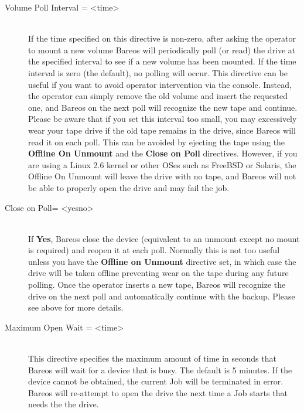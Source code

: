 \begin{description}
\item [Volume Poll Interval = {\textless}time{\textgreater}] \hfill \\
If the time  specified on this directive is non-zero, after  asking the
operator to mount a new volume Bareos will  periodically poll (or read) the
drive at the specified  interval to see if a new volume has been mounted. If
the  time interval is zero (the default), no polling will occur.  This
directive can be useful if you want to avoid operator  intervention via the
console. Instead, the operator can  simply remove the old volume and insert
the requested one,  and Bareos on the next poll will recognize the new tape
and  continue. Please be aware that if you set this interval  too small, you
may excessively wear your tape drive if the  old tape remains in the drive,
since Bareos will read it on  each poll. This can be avoided by ejecting the
tape using  the {\bf Offline On Unmount} and the {\bf Close on Poll}
directives.
However, if you are using a Linux 2.6 kernel or other OSes
such as FreeBSD or Solaris, the Offline On Unmount will leave the drive
with no tape, and Bareos will not be able to properly open the drive and
may fail the job.

\item [Close on Poll= {\textless}yes{\textbar}no{\textgreater}] \hfill \\
If {\bf Yes}, Bareos close the device (equivalent to  an unmount except no
mount is required) and reopen it at each  poll. Normally this is not too
useful unless you have the  {\bf Offline on Unmount} directive set, in which
case the  drive will be taken offline preventing wear on the tape  during any
future polling. Once the operator inserts a new  tape, Bareos will recognize
the drive on the next poll and  automatically continue with the backup.
Please see above for more details.

\item [Maximum Open Wait = {\textless}time{\textgreater}] \hfill \\
This directive specifies the maximum amount of time in seconds that
Bareos will wait for a device that is busy.  The default is 5 minutes.
If the device cannot be obtained, the current Job will be terminated in
error.  Bareos will re-attempt to open the drive the next time a Job
starts that needs the the drive.


\end{description}
